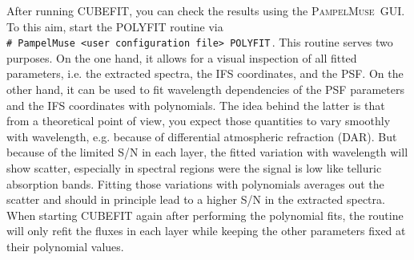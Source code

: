 \documentclass[a4paper,10pt]{article}
\newcommand{\shellcmd}[1]{\\\indent\indent\texttt{\footnotesize\# #1}}
\newcommand{\pampelmuse}{\textsc{PampelMuse}\ }
\begin{document}
After running CUBEFIT, you can check the results using the \pampelmuse GUI. To this aim, start the POLYFIT routine via 
\shellcmd{PampelMuse <user configuration file> POLYFIT}\,.
This routine serves two purposes. On the one hand, it allows for a visual inspection of all fitted parameters, i.e. the extracted spectra, the IFS coordinates, and the PSF. On the other hand, it can be used to fit wavelength dependencies of the PSF parameters and the IFS coordinates with polynomials. The idea behind the latter is that from a theoretical point of view, you expect those quantities to vary smoothly with wavelength, e.g. because of differential atmospheric refraction (DAR). But because of the limited S/N in each layer, the fitted variation with wavelength will show scatter, especially in spectral regions were the signal is low like telluric absorption bands. Fitting those variations with polynomials averages out the scatter and should in principle lead to a higher S/N in the extracted spectra. When starting CUBEFIT again after performing the polynomial fits, the routine will only refit the fluxes in each layer while keeping the other parameters fixed at their polynomial values.
\end{document}
